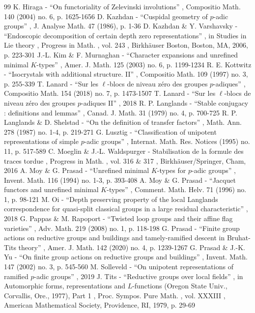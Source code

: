 \documentclass[11pt]{article}
\numberwithin{equation}{section}\providecommand{\og}{«\,}\providecommand{\fg}{\,»}
\begin{document}
\begin{thebibliography}{99}
 K. Hiraga - “On functoriality of Zelevinski involutions” , Compositio Math. 140 (2004) no. 6, p. 1625-1656
 D. Kazhdan - “Cuspidal geometry of $p$-adic groups” , J. Analyse Math. 47 (1986), p. 1-36
 D. Kazhdan \& Y. Varshavsky - “Endoscopic decomposition of certain depth zero representations” , in Studies in Lie theory , Progress in Math. , vol. 243 , Birkhäuser Boston, Boston, MA, 2006, p. 223-301
 J.-L. Kim \& F. Murnaghan - “Character expansions and unrefined minimal $K$-types” , Amer. J. Math. 125 (2003) no. 6, p. 1199-1234
 R. E. Kottwitz - “Isocrystals with additional structure. II” , Compositio Math. 109 (1997) no. 3, p. 255-339
 T. Lanard - “Sur les $\ell $-blocs de niveau zéro des groupes $p$-adiques” , Compositio Math. 154 (2018) no. 7, p. 1473-1507
 T. Lanard - “Sur les $\ell $-blocs de niveau zéro des groupes $p$-adiques II” , 2018
 R. P. Langlands - “Stable conjugacy : definitions and lemmas” , Canad. J. Math. 31 (1979) no. 4, p. 700-725
 R. P. Langlands \& D. Shelstad - “On the definition of transfer factors” , Math. Ann. 278 (1987) no. 1-4, p. 219-271
 G. Lusztig - “Classification of unipotent representations of simple $p$-adic groups” , Internat. Math. Res. Notices (1995) no. 11, p. 517-589
 C. Moeglin \& J.-L. Waldspurger - Stabilisation de la formule des traces tordue , Progress in Math. , vol. 316 \& 317 , Birkhäuser/Springer, Cham, 2016
 A. Moy \& G. Prasad - “Unrefined minimal $K$-types for $p$-adic groups” , Invent. Math. 116 (1994) no. 1-3, p. 393-408
 A. Moy \& G. Prasad - “Jacquet functors and unrefined minimal $K$-types” , Comment. Math. Helv. 71 (1996) no. 1, p. 98-121
 M. Oi - “Depth preserving property of the local Langlands correspondence for quasi-split classical groups in a large residual characteristic” , 2018
 G. Pappas \& M. Rapoport - “Twisted loop groups and their affine flag varieties” , Adv. Math. 219 (2008) no. 1, p. 118-198
 G. Prasad - “Finite group actions on reductive groups and buildings and tamely-ramified descent in Bruhat-Tits theory” , Amer. J. Math. 142 (2020) no. 4, p. 1239-1267
 G. Prasad \& J.-K. Yu - “On finite group actions on reductive groups and buildings” , Invent. Math. 147 (2002) no. 3, p. 545-560
 M. Solleveld - “On unipotent representations of ramified $p$-adic groups” , 2019
 J. Tits - “Reductive groups over local fields” , in Automorphic forms, representations and $L$-functions (Oregon State Univ., Corvallis, Ore., 1977), Part 1 , Proc. Sympos. Pure Math. , vol. XXXIII , American Mathematical Society, Providence, RI, 1979, p. 29-69

\end{thebibliography}
\end{document}
